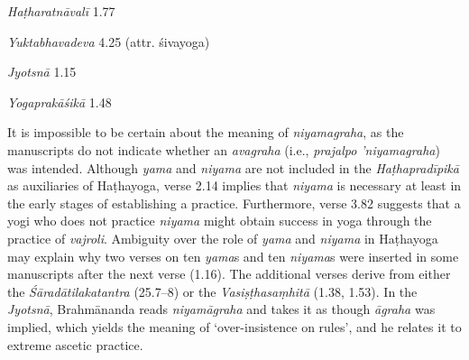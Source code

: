 \begin{ekdosis}
\begin{testimonia}[hp01_015]
\emph{Haṭharatnāvalī} 1.77

\begin{versinnote}
\tl{\var{niyamagrahaḥ ] niyamāgrahaḥ N,J}\\!}
\end{versinnote}

\emph{Yuktabhavadeva} 4.25 (attr. śivayoga)

\begin{versinnote}
\end{versinnote}

\emph{Jyotsnā} 1.15

\begin{versinnote}
\end{versinnote}

\emph{Yogaprakāśikā} 1.48

\begin{versinnote}
\end{versinnote}

\end{testimonia}

\begin{philcomm}[hp01_015]        
It is impossible to be certain about the meaning of \emph{niyamagraha}, as the manuscripts do not indicate whether an \emph{avagraha} (i.e., \emph{prajalpo ’niyamagraha}) was intended. Although \emph{yama} and \emph{niyama} are not included in the \emph{Haṭhapradīpikā} as auxiliaries of Haṭhayoga, verse 2.14 implies that \emph{niyama} is necessary at least in the early stages of establishing a practice. Furthermore, verse 3.82 suggests that a yogi who does not practice \emph{niyama} might obtain success in yoga through the practice of \textit{vajroli}. Ambiguity over the role of \emph{yama} and \emph{niyama} in Haṭhayoga may explain why two verses on ten \emph{yama}s and ten \emph{niyama}s were inserted in some manuscripts after the next verse (1.16). The additional verses derive from either the \emph{Śāradātilakatantra} (25.7–8) or the  \emph{Vasiṣṭhasaṃhitā} (1.38, 1.53). In the \emph{Jyotsnā}, Brahmānanda reads \emph{niyamāgraha} and takes it as though \emph{āgraha} was implied, which yields the meaning of ‘over-insistence on rules’, and he relates it to extreme ascetic practice.
\end{philcomm}


\end{ekdosis}
